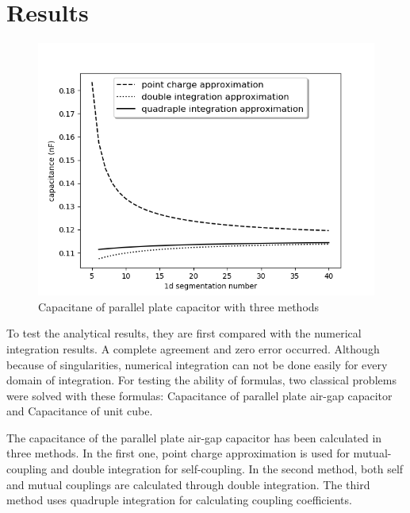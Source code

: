 \documentclass[final,5p,times,twocolumn]{elsarticle}
\begin{document}
\section{Results}
\begin {figure}[h]
	\center
	\includegraphics[width=\linewidth]	{saeedvshitoshiandzho.png}
	\caption{Capacitane of parallel plate capacitor with three  methods}
\end{figure}
To test the analytical results, they are first compared with the numerical integration results. A complete agreement and zero error occurred. Although because of singularities, numerical integration can not be done easily for every domain of integration. For testing the ability of formulas, two classical problems were solved with these formulas: Capacitance of parallel plate air-gap capacitor and Capacitance of unit cube.



The capacitance of the parallel plate air-gap capacitor has been calculated in three methods. In the first one, point charge approximation is used for mutual-coupling and double integration for self-coupling. In the second method, both self and mutual couplings are calculated through double integration. The third method uses quadruple integration for calculating coupling coefficients. 
\end{document}
